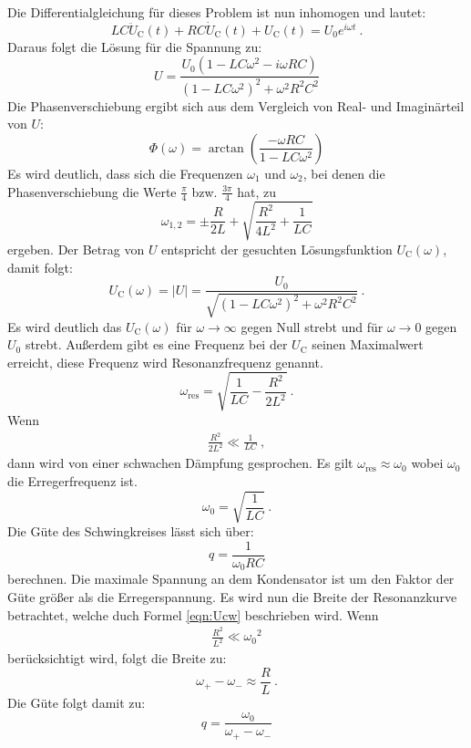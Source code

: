 Die Differentialgleichung für dieses Problem ist nun inhomogen und lautet:
\begin{equation}
	LC \ddot{U}_\text{C}(t) + RC \dot{U}_\text{C}(t) + U_\text{C}(t) = U_0 e^{i \omega t} \ .
\end{equation}
Daraus folgt die Lösung für die Spannung zu:
\begin{equation}
	U = \frac{U_0(1 - LC \omega^2 - i \omega RC)}{(1 - LC \omega^2)^2 + \omega^2 R^2 C^2} 
\end{equation}
Die Phasenverschiebung ergibt sich aus dem Vergleich von Real- und Imaginärteil von $U$:
\begin{equation}
	\Phi (\omega) = \arctan \left(\frac{-\omega RC}{1-LC\omega^2}  \right)
\end{equation}
Es wird deutlich, dass sich die Frequenzen $\omega_1$ und $\omega_2$, bei denen die Phasenverschiebung die Werte $\frac{\pi}{4}$ bzw. $\frac{3\pi}{4}$ hat, zu
\begin{equation}
	\omega_{1,2} = \pm \frac{R}{2L} + \sqrt{\frac{R^2}{4L^2} + \frac{1}{LC}}
	\label{eqn:w12}
\end{equation}
ergeben.
Der Betrag von $U$ entspricht der gesuchten Lösungsfunktion $U_\text{C}(\omega)$, damit folgt:
\begin{equation}
	U_\text{C}(\omega) = |U| = \frac{U_0}{\sqrt{(1 - LC \omega^2)^2 + \omega^2 R^2 C^2}} \ .
	\label{eqn:Ucw}
\end{equation}
Es wird deutlich das $U_\text{C}(\omega)$ für $\omega \to \infty$ gegen Null strebt und für $\omega \to 0$ gegen $U_0$ strebt. Außerdem gibt es eine Frequenz bei der $U_\text{C}$ seinen Maximalwert erreicht, diese Frequenz wird Resonanzfrequenz genannt.
\begin{equation}
	\omega_\text{res} = \sqrt{\frac{1}{LC} - \frac{R^2}{2L^2}} \ .
	\label{eqn:wres}
\end{equation}
Wenn
\begin{align*}
	\frac{R^2}{2L^2} \ll \frac{1}{LC} \ ,
\end{align*}
dann wird von einer schwachen Dämpfung gesprochen. Es gilt $\omega_\text{res} \approx \omega_0$ wobei $\omega_0$ die Erregerfrequenz ist.
\begin{equation}
	\omega_0 = \sqrt{\frac{1}{LC}} \ .
\end{equation}
Die Güte des Schwingkreises lässt sich über:
\begin{equation}
	q = \frac{1}{\omega_0 RC}
	\label{eqn:q}
\end{equation}
berechnen. Die maximale Spannung an dem Kondensator ist um den Faktor der Güte größer als die Erregerspannung. Es wird nun die Breite der Resonanzkurve betrachtet, welche duch Formel \ref{eqn:Ucw} beschrieben wird. Wenn
\begin{align*}
	\frac{R^2}{L^2} \ll {\omega_0}^2
\end{align*}
berücksichtigt wird, folgt die Breite zu:
\begin{equation}
	\omega_+ - \omega_- \approx \frac{R}{L} \ .
	\label{eqn:qbreite}
\end{equation}
Die Güte folgt damit zu:
\begin{equation}
	q = \frac{\omega_0}{\omega_+ - \omega_-}
\end{equation}


